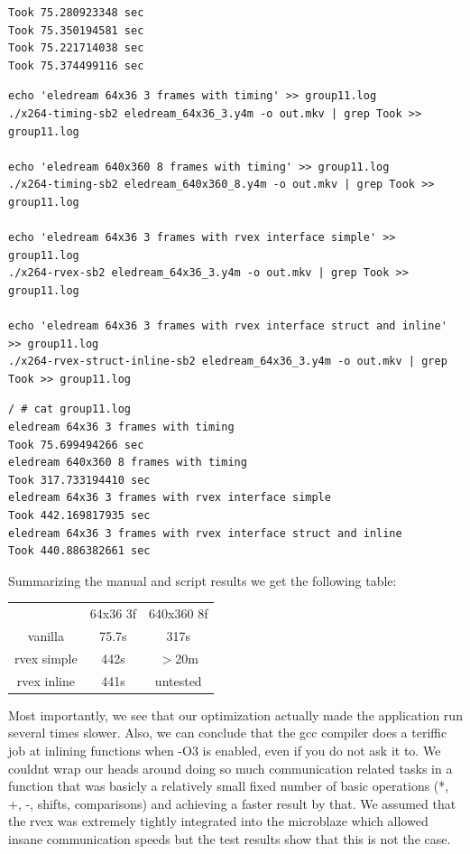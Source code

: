 \documentclass{article}
\begin{document}
\begin{lstlisting}
Took 75.280923348 sec
Took 75.350194581 sec
Took 75.221714038 sec
Took 75.374499116 sec
\end{lstlisting}

\begin{lstlisting}[style=bash,caption=Test script,label=lst:testscript]
echo 'eledream 64x36 3 frames with timing' >> group11.log
./x264-timing-sb2 eledream_64x36_3.y4m -o out.mkv | grep Took >> group11.log

echo 'eledream 640x360 8 frames with timing' >> group11.log
./x264-timing-sb2 eledream_640x360_8.y4m -o out.mkv | grep Took >> group11.log

echo 'eledream 64x36 3 frames with rvex interface simple' >> group11.log
./x264-rvex-sb2 eledream_64x36_3.y4m -o out.mkv | grep Took >> group11.log

echo 'eledream 64x36 3 frames with rvex interface struct and inline' >> group11.log
./x264-rvex-struct-inline-sb2 eledream_64x36_3.y4m -o out.mkv | grep Took >> group11.log
\end{lstlisting}

\begin{lstlisting}[caption=Test output,label=lst:testoutput]
/ # cat group11.log
eledream 64x36 3 frames with timing
Took 75.699494266 sec
eledream 640x360 8 frames with timing
Took 317.733194410 sec
eledream 64x36 3 frames with rvex interface simple
Took 442.169817935 sec
eledream 64x36 3 frames with rvex interface struct and inline
Took 440.886382661 sec
\end{lstlisting}

Summarizing the manual and script results we get the following table:

\begin{tabular}{ c | c c }
   & 64x36 3f & 640x360 8f \\
   vanilla & 75.7s & 317s \\
   rvex simple & 442s & $>$20m \\
   rvex inline & 441s & untested \\
\end{tabular}

Most importantly, we see that our optimization actually made the application run several times slower. 
Also, we can conclude that the gcc compiler does a teriffic job at inlining functions when -O3 is enabled, even if you do not ask it to. 
We couldnt wrap our heads around doing so much communication related tasks in a function that was basicly a relatively small fixed number of basic operations (*, +, -, shifts, comparisons) and achieving a faster result by that. 
We assumed that the rvex was extremely tightly integrated into the microblaze which allowed insane communication speeds but the test results show that this is not the case. 
\end{document}
